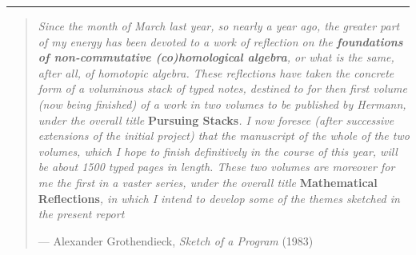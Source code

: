 \documentclass{article}
\renewcommand{\texttt}[1]{%
  \begingroup
  \ttfamily
  \begingroup\lccode`~=`/\lowercase{\endgroup\def~}{/\discretionary{}{}{}}%
  \begingroup\lccode`~=`[\lowercase{\endgroup\def~}{[\discretionary{}{}{}}%
  \begingroup\lccode`~=`.\lowercase{\endgroup\def~}{.\discretionary{}{}{}}%
  \catcode`/=\active\catcode`[=\active\catcode`.=\active
  \scantokens{#1\noexpand}%
  \endgroup
}
\begin{document}

\begin{center}\rule{0.5\linewidth}{0.5pt}\end{center}

\begin{quote}
\emph{Since the month of March last year, so nearly a year ago, the
greater part of my energy has been devoted to a work of reflection on
the \textbf{foundations of non-commutative (co)homological algebra}, or
what is the same, after all, of homotopic algebra. These reflections
have taken the concrete form of a voluminous stack of typed notes,
destined to for then first volume (now being finished) of a work in two
volumes to be published by Hermann, under the overall title}
\textbf{Pursuing Stacks}\emph{. I now foresee (after successive
extensions of the initial project) that the manuscript of the whole of
the two volumes, which I hope to finish definitively in the course of
this year, will be about 1500 typed pages in length. These two volumes
are moreover for me the first in a vaster series, under the overall
title} \textbf{Mathematical Reflections}\emph{, in which I intend to
develop some of the themes sketched in the present report}

--- Alexander Grothendieck,
\textsl{Sketch of a Program} (1983)
\end{quote}
\end{document}
